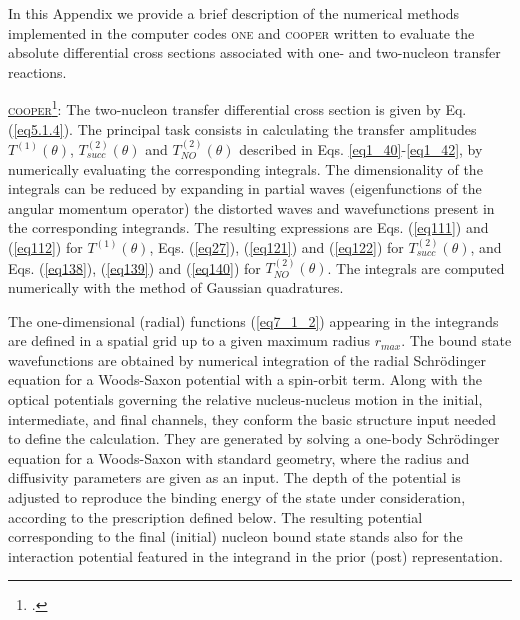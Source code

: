 \begin{subappendices}
In this Appendix we provide a brief description of the numerical methods implemented in the computer codes \textsc{one} and \textsc{cooper} written to evaluate the absolute differential cross sections associated with one- and two-nucleon transfer reactions.


 
 
 
 \underline{\textsc{cooper}}\footnote{\cite{Potel:12c}.}: The two-nucleon transfer differential cross section is given by Eq. (\ref{eq5.1.4}).  The principal task consists in calculating the transfer amplitudes $T^{(1)}(\theta)$, $T^{(2)}_{succ}(\theta)$ and $T^{(2)}_{NO}(\theta)$ described in Eqs. \ref{eq1_40}-\ref{eq1_42}, by numerically evaluating the corresponding integrals.  The dimensionality of the integrals  can be reduced by expanding in partial waves (eigenfunctions of the angular momentum operator) the distorted waves and wavefunctions present in the corresponding integrands. The resulting expressions are Eqs. (\ref{eq111}) and (\ref{eq112}) for $T^{(1)}(\theta)$, Eqs. (\ref{eq27}), (\ref{eq121}) and (\ref{eq122}) for $T^{(2)}_{succ}(\theta)$, and Eqs. (\ref{eq138}), (\ref{eq139}) and (\ref{eq140}) for $T^{(2)}_{NO}(\theta)$. The integrals are computed numerically with the method of Gaussian quadratures. 


The one-dimensional (radial) functions (\ref{eq7_1_2}) appearing in the integrands are defined in a spatial grid up to a given maximum radius $r_{max}$. The bound state  wavefunctions are obtained by numerical integration of the radial Schr\"odinger equation for a Woods-Saxon potential with a spin-orbit term. Along with the optical potentials governing the relative nucleus-nucleus motion in the initial, intermediate, and final channels, they conform the basic structure input needed to define the calculation. They are generated by solving a one-body Schr\"odinger equation for a Woods-Saxon with standard geometry, where the radius and diffusivity parameters are given as an input. The depth of the potential is adjusted to reproduce the binding energy of the state under consideration, according to the prescription defined below. The resulting potential corresponding to the final (initial) nucleon bound state stands also for the interaction potential featured in the integrand in the prior (post) representation. 


\end{subappendices}
